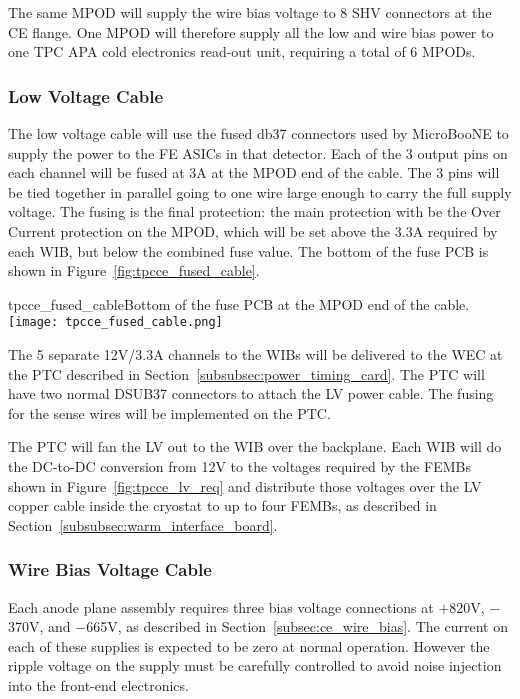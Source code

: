 The same MPOD will supply the wire bias voltage to 8 SHV connectors at the CE flange.
One MPOD will therefore supply all the low and wire bias power to one TPC APA cold
electronics read-out unit, requiring a total of 6 MPODs.

%
\subsubsection{Low Voltage Cable}
\label{subsubsec:ce_feedthrough_lv}

The low voltage cable will use the fused db37 connectors used by MicroBooNE to 
supply the power to the FE ASICs in that detector. Each of the 3 output pins on
each channel will be fused at 3A at the MPOD end of the cable. The 3 pins will be tied together in parallel 
going to one wire large enough to carry the full supply voltage. The fusing is
the final protection: the main protection with be the Over Current protection
on the MPOD, which will be set above the 3.3A required by each WIB, but below the
combined fuse value. The bottom of the fuse PCB is shown in Figure~\ref{fig:tpcce_fused_cable}.

\begin{cdrfigure}{tpcce_fused_cable}{Bottom of the fuse PCB at the MPOD end of the cable.}
\texttt{[image: tpcce\_fused\_cable.png]}
\end{cdrfigure}

The 5 separate 12V/3.3A channels to the WIBs will be delivered to the WEC at the PTC described
in Section~\ref{subsubsec:power_timing_card}. The PTC will have two normal DSUB37 connectors to
attach the LV power cable. The fusing for the sense wires will be implemented on the PTC.

The PTC will fan the LV out to the WIB over the backplane. Each WIB will do the DC-to-DC conversion
from 12V to the voltages required by the FEMBs shown in Figure~\ref{fig:tpcce_lv_req} and 
distribute those voltages over the LV copper cable inside the cryostat to up to four FEMBs, as described in 
Section~\ref{subsubsec:warm_interface_board}.

%
\subsubsection{Wire Bias Voltage Cable}
\label{subsubsec:ce_feedthrough_wirebias}

Each anode plane assembly requires three bias voltage connections 
at $+$820V, $-$370V, and $-$665V, as described in Section~\ref{subsec:ce_wire_bias}.
The current on each of these supplies is expected to be zero at normal operation.
However the ripple voltage on the supply must be carefully controlled 
to avoid noise injection into the front-end electronics.

